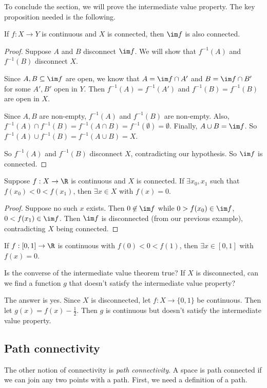 \documentclass[a4paper]{article}
\begin{document}
To conclude the section, we will prove the intermediate value property. The key proposition needed is the following.
\begin{prop}
  If $f: X\to Y$ is continuous and $X$ is connected, then $\im f$ is also connected.
\end{prop}

\begin{proof}
  Suppose $A$ and $B$ disconnect $\im f$. We will show that $f^{-1}(A)$ and $f^{-1}(B)$ disconnect $X$.
  
  Since $A, B\subseteq \im f$ are open, we know that $A = \im f\cap A'$ and $B = \im f\cap B'$ for some $A', B'$ open in $Y$. Then $f^{-1}(A) = f^{-1}(A')$ and $f^{-1}(B) = f^{-1}(B)$ are open in $X$.

  Since $A, B$ are non-empty, $f^{-1}(A)$ and $f^{-1}(B)$ are non-empty. Also, $f^{-1}(A) \cap f^{-1}(B) = f^{-1}(A\cap B) = f^{-1}(\emptyset) = \emptyset$. Finally, $A\cup B = \im f$. So $f^{-1}(A)\cup f^{-1}(B) = f^{-1}(A\cup B) = X$.

  So $f^{-1}(A)$ and $f^{-1}(B)$ disconnect $X$, contradicting our hypothesis. So $\im f$ is connected.
\end{proof}

\begin{thm}
  Suppose $f: X\to \R$ is continuous and $X$ is connected. If $\exists x_0, x_1$ such that $f(x_0) < 0 < f(x_1)$, then $\exists x\in X$ with $f(x) = 0$.
\end{thm}

\begin{proof}
  Suppose no such $x$ exists. Then $0\not\in \im f$ while $0 > f(x_0) \in \im f$, $0 < f(x_1) \in \im f$. Then $\im f$ is disconnected (from our previous example), contradicting $X$ being connected.
\end{proof}

\begin{cor}
  If $f: [0, 1] \to \R$ is continuous with $f(0) < 0 < f(1)$, then $\exists x\in [0, 1]$ with $f(x) = 0$.
\end{cor}
Is the converse of the intermediate value theorem true? If $X$ is disconnected, can we find a function $g$ that doesn't satisfy the intermediate value property?

The answer is yes. Since $X$ is disconnected, let $f: X\to \{0, 1\}$ be continuous. Then let $g(x) = f(x) - \frac{1}{2}$. Then $g$ is continuous but doesn't satisfy the intermediate value property.

\subsection{Path connectivity}
The other notion of connectivity is \emph{path connectivity}. A space is path connected if we can join any two points with a path. First, we need a definition of a path.
\end{document}
